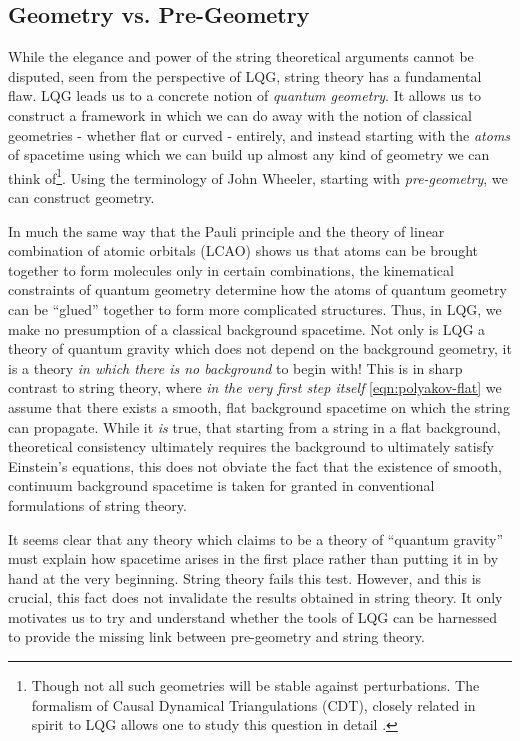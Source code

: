 \documentclass{ws-mpla}
\begin{document}
\subsection{Geometry vs. Pre-Geometry}\label{sec:pregeom-1}

While the elegance and power of the string theoretical arguments cannot be disputed, seen from the perspective of LQG, string theory has a fundamental flaw. LQG leads us to a concrete notion of \emph{quantum geometry}. It allows us to construct a framework in which we can do away with the notion of classical geometries - whether flat or curved - entirely, and instead starting with the \emph{atoms} of spacetime \cite{Krasnov2009Black,Rovelli2006A-semiclassical} using which we can build up almost any kind of geometry we can think of\footnote{Though not all such geometries will be stable against perturbations. The formalism of Causal Dynamical Triangulations (CDT), closely related in spirit to LQG allows one to study this question in detail \cite{Ambjorn2013Quantum}.}. Using the terminology of John Wheeler, starting with \emph{pre-geometry}, we can construct geometry.

In much the same way that the Pauli principle and the theory of linear combination of atomic orbitals (LCAO) shows us that atoms can be brought together to form molecules only in certain combinations, the kinematical constraints of quantum geometry determine how the atoms of quantum geometry can be ``glued'' together to form more complicated structures. Thus, in LQG, we make no presumption of a classical background spacetime. Not only is LQG a theory of quantum gravity which does not depend on the background geometry, it is a theory \emph{in which there is no background} to begin with! This is in sharp contrast to string theory, where \emph{in the very first step itself} \eqref{eqn:polyakov-flat} we assume that there exists a smooth, flat background spacetime on which the string can propagate. While it \emph{is} true, that starting from a string in a flat background, theoretical consistency ultimately requires the background to ultimately satisfy Einstein's equations, this does not obviate the fact that the existence of smooth, continuum background spacetime is taken for granted in conventional formulations of string theory.

It seems clear that any theory which claims to be a theory of ``quantum gravity'' must explain how spacetime arises in the first place rather than putting it in by hand at the very beginning. String theory fails this test. However, and this is crucial, this fact does not invalidate the results obtained in string theory. It only motivates us to try and understand whether the tools of LQG can be harnessed to provide the missing link between pre-geometry and string theory.
\end{document}
